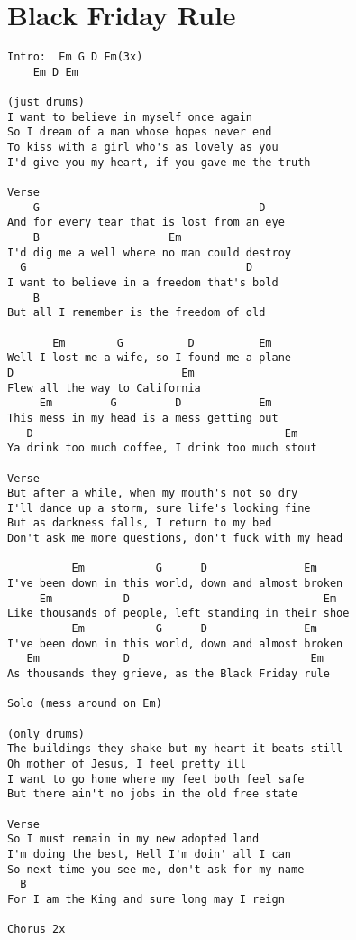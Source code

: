 \documentclass[leqno]{memoir}
\begin{document}
\chapter{Black Friday Rule}
\begin{verbatim}
Intro:  Em G D Em(3x)
    Em D Em

(just drums)
I want to believe in myself once again
So I dream of a man whose hopes never end
To kiss with a girl who's as lovely as you
I'd give you my heart, if you gave me the truth

Verse
    G                                  D
And for every tear that is lost from an eye
    B                    Em
I'd dig me a well where no man could destroy
  G                                  D
I want to believe in a freedom that's bold
    B
But all I remember is the freedom of old

       Em        G          D          Em
Well I lost me a wife, so I found me a plane
D                          Em
Flew all the way to California
     Em         G         D            Em
This mess in my head is a mess getting out
   D                                       Em
Ya drink too much coffee, I drink too much stout

Verse
But after a while, when my mouth's not so dry
I'll dance up a storm, sure life's looking fine
But as darkness falls, I return to my bed
Don't ask me more questions, don't fuck with my head

          Em           G      D               Em
I've been down in this world, down and almost broken
     Em           D                              Em
Like thousands of people, left standing in their shoe
          Em           G      D               Em
I've been down in this world, down and almost broken
   Em             D                            Em
As thousands they grieve, as the Black Friday rule

Solo (mess around on Em)

(only drums)
The buildings they shake but my heart it beats still
Oh mother of Jesus, I feel pretty ill
I want to go home where my feet both feel safe
But there ain't no jobs in the old free state

Verse
So I must remain in my new adopted land
I'm doing the best, Hell I'm doin' all I can
So next time you see me, don't ask for my name
  B
For I am the King and sure long may I reign

Chorus 2x

\end{verbatim}
\newpage
\end{document}
